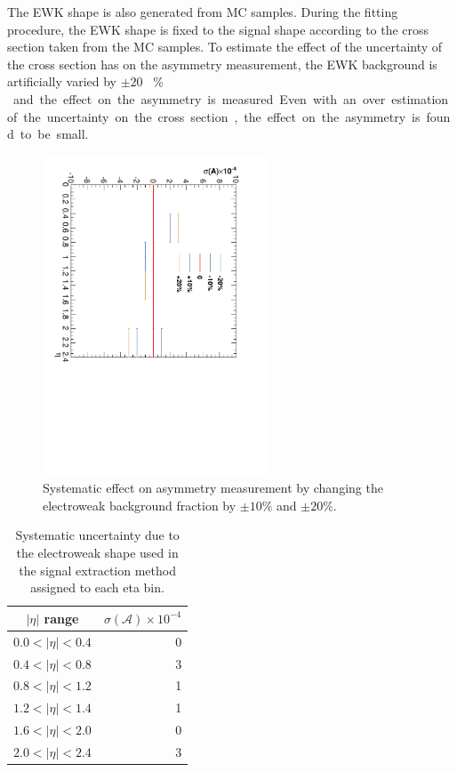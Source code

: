 The \ac{EWK} shape is also generated from \ac{MC} samples. During the fitting
procedure, the \ac{EWK} shape is fixed to the \Wenu signal shape according to
the cross section taken from the \ac{MC} samples. To estimate the effect of the
uncertainty of the cross section has on the asymmetry measurement, the \ac{EWK}
background is artificially varied by \unit{$\pm20$}{ \% } and the effect on the
asymmetry is measured. Even with an over estimation of the uncertainty on the
cross section, the effect on the asymmetry is found to be small.
\begin{figure}[htb]
 \begin{center}
  \includegraphics*[width=0.6\textwidth,angle=90]{EWKFrac}
 \caption{\label{fig:systEWK}Systematic effect on asymmetry measurement by changing the electroweak background fraction by $\pm 10\%$ and $\pm 20\%$.}
  \end{center}
\end{figure}



\begin{table}[htb]
\begin{center}
\begin{tabular}{cr}
$|\eta|$ range & $\sigma(\mathcal{A}) \times 10^{-4}$\\
\hline
$0.0<|\eta|<0.4$ & 0\\
$0.4<|\eta|<0.8$ & 3\\
$0.8<|\eta|<1.2$ & 1\\
$1.2<|\eta|<1.4$ & 1\\
$1.6<|\eta|<2.0$ & 0\\
$2.0<|\eta|<2.4$ & 3\\
\end{tabular}
\caption{\label{tab:systEWK}Systematic uncertainty due to the electroweak \ETm shape used in the signal extraction method assigned to each eta bin.}
\end{center}
\end{table}


